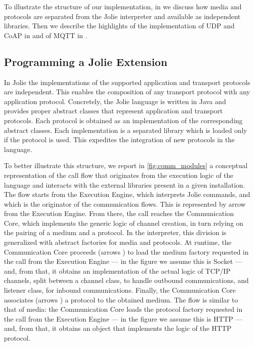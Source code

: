 To illustrate the structure of our implementation, in
 we discuss how media and protocols are separated
from the Jolie interpreter and available as independent libraries. Then we
describe the highlights of the implementation of UDP and CoAP in
 and of MQTT in .

\subsection{Programming a Jolie Extension}
\label{sub:jolie_extensions}

In Jolie the implementations of the supported application and transport
protocols are independent. This enables the composition of any transport
protocol with any application protocol. Concretely, the Jolie language is
written in Java and provides proper abstract classes that represent
application and transport protocols. Each protocol is obtained as an
implementation of the corresponding abstract classes. Each implementation is a
separated library which is loaded only if the protocol is used. This expedites
the integration of new protocols in the language.

To better illustrate this structure, we report in \cref{fig:comm_modules} a
conceptual representation of the call flow that originates from the execution
logic of the language and interacts with the external libraries present in a
given installation. The flow starts from the \textsf{Execution Engine}, which
interprets Jolie commands, and which is the originator of the communication
flows. This is represented by arrow  from the \textsf{Execution
Engine}. From there, the call reaches the \textsf{Communication Core}, which
implements the generic logic of channel creation, in turn relying on the
pairing of a medium and a protocol. In the interpreter, this division is
generalized with abstract factories for media and protocols. At runtime, the
\textsf{Communication Core} proceeds (arrows ) to load the medium
factory requested in the call from the \textsf{Execution Engine} --- in the
figure we assume this is \textsf{Socket} --- and, from that, it obtains an
implementation of the actual logic of TCP/IP channels, split between a channel
class, to handle outbound communications, and listener class, for inbound
communications. Finally, the \textsf{Communication Core} associates (arrows
) a protocol to the obtained medium. The flow is similar to that of
media: the \textsf{Communication Core} loads the protocol factory requested in
the call from the \textsf{Execution Engine} --- in the figure we assume this
is HTTP
--- and, from that, it obtains an object that implements the logic of the HTTP
protocol.

